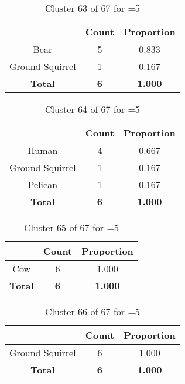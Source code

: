 \begin{table}[ht!]
\centering
\begin{tabular}{|c|c|c|}
\hline
\bf \Spec{} &\bf Count &\bf Proportion\\ \hline \hline
Bear & 5 & 0.833\\ \hline
Ground Squirrel & 1 & 0.167\\ \hline
\hline
\bf Total & \bf 6 & \bf 1.000\\ \hline
\end{tabular}
\label{tab:cluster:63:5}
\caption{Cluster 63 of 67 for \minneigh{}=5}
\end{table}

\begin{table}[ht!]
\centering
\begin{tabular}{|c|c|c|}
\hline
\bf \Spec{} &\bf Count &\bf Proportion\\ \hline \hline
Human & 4 & 0.667\\ \hline
Ground Squirrel & 1 & 0.167\\ \hline
Pelican & 1 & 0.167\\ \hline
\hline
\bf Total & \bf 6 & \bf 1.000\\ \hline
\end{tabular}
\label{tab:cluster:64:5}
\caption{Cluster 64 of 67 for \minneigh{}=5}
\end{table}

\begin{table}[ht!]
\centering
\begin{tabular}{|c|c|c|}
\hline
\bf \Spec{} &\bf Count &\bf Proportion\\ \hline \hline
Cow & 6 & 1.000\\ \hline
\hline
\bf Total & \bf 6 & \bf 1.000\\ \hline
\end{tabular}
\label{tab:cluster:65:5}
\caption{Cluster 65 of 67 for \minneigh{}=5}
\end{table}

\begin{table}[ht!]
\centering
\begin{tabular}{|c|c|c|}
\hline
\bf \Spec{} &\bf Count &\bf Proportion\\ \hline \hline
Ground Squirrel & 6 & 1.000\\ \hline
\hline
\bf Total & \bf 6 & \bf 1.000\\ \hline
\end{tabular}
\label{tab:cluster:66:5}
\caption{Cluster 66 of 67 for \minneigh{}=5}
\end{table}

